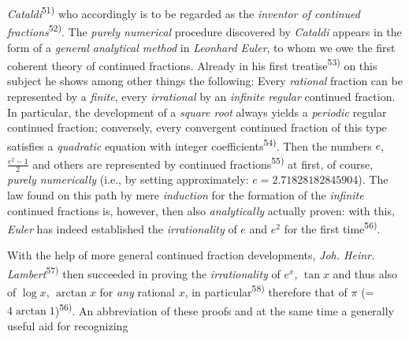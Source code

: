 \thispagestyle{fancy}

\vspace{0.5cm}

\textit{Cataldi}\textsuperscript{51)} who accordingly is to be regarded as the \textit{inventor of continued fractions}\textsuperscript{52)}. The \textit{purely numerical} procedure discovered by \textit{Cataldi} appears in the form of a \textit{general analytical method} in \textit{Leonhard Euler}, to whom we owe the first coherent theory of continued fractions. Already in his first treatise\textsuperscript{53)} on this subject he shows among other things the following: Every \textit{rational} fraction can be represented by a \textit{finite}, every \textit{irrational} by an \textit{infinite regular} continued fraction. In particular, the development of a \textit{square root} always yields a \textit{periodic} regular continued fraction; conversely, every convergent continued fraction of this type satisfies a \textit{quadratic} equation with integer coefficients\textsuperscript{54)}. Then the numbers $e$, $\frac{e^2 - 1}{2}$ and others are represented by continued fractions\textsuperscript{55)} at first, of course, \textit{purely numerically} (i.e., by setting approximately: $e = 2.71828182845904$). The law found on this path by mere \textit{induction} for the formation of the \textit{infinite} continued fractions is, however, then also \textit{analytically} actually proven: with this, \textit{Euler} has indeed established the \textit{irrationality} of $e$ and $e^2$ for the first time\textsuperscript{56)}.

With the help of more general continued fraction developments, \textit{Joh. Heinr. Lambert}\textsuperscript{57)} then succeeded in proving the \textit{irrationality} of $e^x$, $\tan x$ and thus also of $\log x$, $\arctan x$ for \textit{any} rational $x$, in particular\textsuperscript{58)} therefore that of $\pi$ (= $4 \arctan 1$)\textsuperscript{56)}. An abbreviation of these proofs and at the same time a generally useful aid for recognizing

